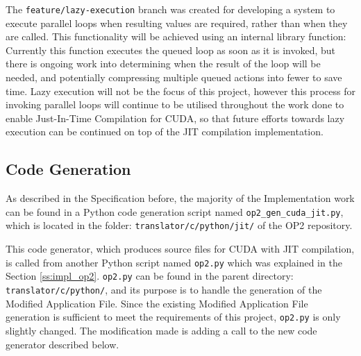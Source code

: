 \par
The \verb|feature/lazy-execution| branch was created for developing a system to execute parallel loops when resulting values are required, rather than when they are called. This functionality will be achieved using an internal library function:
\noindent Currently this function executes the queued loop as soon as it is invoked, but there is ongoing work into determining when the result of the loop will be needed, and potentially compressing multiple queued actions into fewer to save time. Lazy execution will not be the focus of this project, however this process for invoking parallel loops will continue to be utilised throughout the work done to enable Just-In-Time Compilation for CUDA, so that future efforts towards lazy execution can be continued on top of the JIT compilation implementation.

\subsection{Code Generation}
\label{ss:codegen}
As described in the Specification before, the majority of the Implementation work can be found in a Python code generation script named \verb|op2_gen_cuda_jit.py|, which is located in the folder: \verb|translator/c/python/jit/| of the OP2 repository.
\par This code generator, which produces source files for CUDA with JIT compilation, is called from another Python script named \verb|op2.py| which was explained in the Section \ref{ss:impl_op2}. \verb|op2.py| can be found in the parent directory: \verb|translator/c/python/|, and its purpose is to handle the generation of the Modified Application File. Since the existing Modified Application File generation is sufficient to meet the requirements of this project, \verb|op2.py| is only slightly changed. The modification made is adding a call to the new code generator described below.

